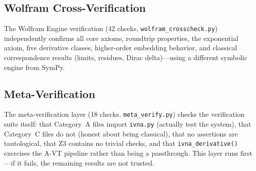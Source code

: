 \documentclass[12pt]{article}
\theoremstyle{definition}
\theoremstyle{remark}
\begin{document}
\subsection{Wolfram Cross-Verification}

The Wolfram Engine verification (42 checks,
\texttt{wolfram\_crosscheck.py}) independently confirms all core
axioms, roundtrip properties, the exponential axiom, five derivative
classes, higher-order embedding behavior, and classical correspondence
results (limits, residues, Dirac delta)---using a different symbolic
engine from SymPy.

\subsection{Meta-Verification}

The meta-verification layer (18 checks, \texttt{meta\_verify.py})
checks the verification suite itself: that Category~A files import
\texttt{ivna.py} (actually test the system), that Category~C files
do not (honest about being classical), that no assertions are
tautological, that Z3 contains no trivial checks, and that
\texttt{ivna\_derivative()} exercises the A-VT pipeline rather than
being a passthrough. This layer runs first---if it fails, the
remaining results are not trusted.
\end{document}
